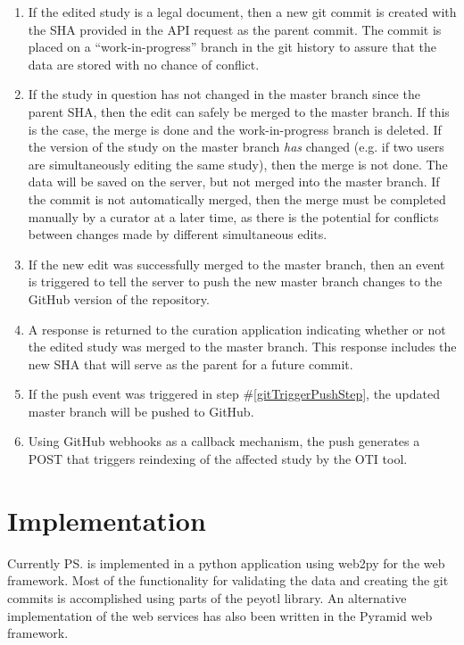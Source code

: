 \begin{methods}
\begin{enumerate}
    \item \label{gitSaveStep} If the edited study is a legal \nexson document, then a new git commit is created with the SHA
        provided in the API request as the parent commit. The commit is placed on a 
        ``work-in-progress'' branch in the git history to assure that the data are stored with 
        no chance of conflict.
    \item \label{gitMergeStep} If the study in question has not changed in the master branch 
        since the parent SHA, then the edit can safely be merged to the master branch.
        If this is the case, the merge is done and the work-in-progress branch is deleted.
        If the version of the study on the master branch {\em has} changed (e.g. if two users are simultaneously editing the same study),
        then the merge is not done. The data will be saved on the server, but not merged into the master branch.
        If the commit is not automatically merged, then the merge must be completed
        manually by a curator at a later time, 
        as there is the potential for conflicts between changes made by different simultaneous edits.
    \item\label{gitTriggerPushStep} If the new edit was successfully merged to the master branch, then an event is triggered to tell the server to push the new master branch changes to the GitHub version
        of the repository.
    \item\label{respondStep} A response is returned to the curation application indicating whether or not the edited study was 
        merged to the master branch. This response includes the new SHA that will serve as the parent for a future commit.
    \item\label{pushStep} If the push event was triggered in step \#\ref{gitTriggerPushStep}, the updated master branch will be pushed to GitHub.
    \item\label{webHookStep} Using GitHub webhooks as a callback mechanism, the push generates a POST that triggers reindexing
        of the affected study by the OTI tool.
\end{enumerate}

\section{Implementation}
Currently \ps is implemented in a python application using web2py for the web framework.
Most of the functionality for validating the data and creating the git commits is accomplished using
    parts of the peyotl library.
An alternative implementation of the web services has also been written in the Pyramid
    web framework.


\end{methods}

